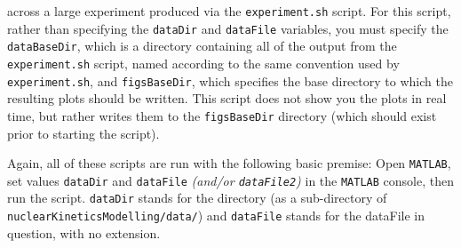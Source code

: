 \documentclass{article}
\begin{document}
\begin{description}
      across a large experiment produced via the \texttt{experiment.sh} script.
      For this script, rather than specifying the \texttt{dataDir} and
      \texttt{dataFile} variables, you must specify the \texttt{dataBaseDir},
      which is a directory containing all of the output from the
      \texttt{experiment.sh} script, named according to the same convention used
      by \texttt{experiment.sh}, and \texttt{figsBaseDir}, which specifies the
      base directory to which the resulting plots should be written. This
      script does not show you the plots in real time, but rather writes them to
      the \texttt{figsBaseDir} directory (which should exist prior to starting
      the script).
  \end{description}
  Again, all of these scripts are run with the following basic premise: Open
  \texttt{MATLAB}, set values \texttt{dataDir} and \texttt{dataFile}
  \textit{(and/or \texttt{dataFile2})} in the \texttt{MATLAB} console, then run
  the script. \texttt{dataDir} stands for the directory (as a sub-directory of
  \texttt{nuclearKineticsModelling/data/}) and \texttt{dataFile} stands for the
  dataFile in question, with no extension.
\end{document}
